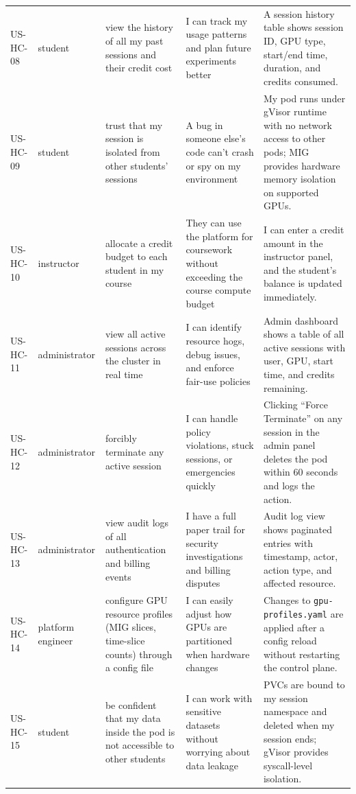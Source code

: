 \documentclass[12pt,a4paper]{article}
\begin{document}
\begin{longtable}{@{}L{2.3cm}L{2.3cm}L{4cm}L{3.5cm}L{3.5cm}@{}}
    US-HC-08 & student & view the history of all my past sessions and their credit cost & I can track my usage patterns and plan future experiments better & A session history table shows session ID, GPU type, start/end time, duration, and credits consumed. \\
  US-HC-09 & student & trust that my session is isolated from other students' sessions & A bug in someone else's code can't crash or spy on my environment & My pod runs under gVisor runtime with no network access to other pods; MIG provides hardware memory isolation on supported GPUs. \\
    US-HC-10 & instructor & allocate a credit budget to each student in my course & They can use the platform for coursework without exceeding the course compute budget & I can enter a credit amount in the instructor panel, and the student's balance is updated immediately. \\
  US-HC-11 & administrator & view all active sessions across the cluster in real time & I can identify resource hogs, debug issues, and enforce fair-use policies & Admin dashboard shows a table of all active sessions with user, GPU, start time, and credits remaining. \\
    US-HC-12 & administrator & forcibly terminate any active session & I can handle policy violations, stuck sessions, or emergencies quickly & Clicking ``Force Terminate'' on any session in the admin panel deletes the pod within 60 seconds and logs the action. \\
  US-HC-13 & administrator & view audit logs of all authentication and billing events & I have a full paper trail for security investigations and billing disputes & Audit log view shows paginated entries with timestamp, actor, action type, and affected resource. \\
    US-HC-14 & platform engineer & configure GPU resource profiles (MIG slices, time-slice counts) through a config file & I can easily adjust how GPUs are partitioned when hardware changes & Changes to \texttt{gpu-profiles.yaml} are applied after a config reload without restarting the control plane. \\
  US-HC-15 & student & be confident that my data inside the pod is not accessible to other students & I can work with sensitive datasets without worrying about data leakage & PVCs are bound to my session namespace and deleted when my session ends; gVisor provides syscall-level isolation. \\

\end{longtable}
\end{document}
